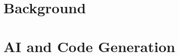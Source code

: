 \documentclass[journal]{IEEEtran}
\begin{document}
\section{Background}




\section{AI and Code Generation}


\end{document}
